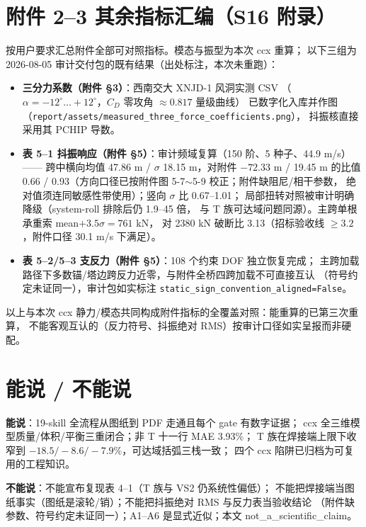 \documentclass[11pt,a4paper]{ctexart}
\begin{document}
\section{附件 2--3 其余指标汇编（S16 附录）}

按用户要求汇总附件全部可对照指标。模态与振型为本次 ccx 重算；
以下三组为 2026-08-05 审计交付包的既有结果（出处标注，本次未重跑）：

\begin{itemize}
  \item \textbf{三分力系数（附件 §3）}：西南交大 XNJD-1 风洞实测 CSV
        （$\alpha=-12^\circ\ldots+12^\circ$，$C_D$ 零攻角 $\approx0.817$ 量级曲线）
        已数字化入库并作图（\texttt{report/assets/measured\_three\_force\_coefficients.png}），
        抖振核直接采用其 PCHIP 导数。
  \item \textbf{表 5--1 抖振响应（附件 §5）}：审计频域复算（150 阶、5 种子、44.9 m/s）——
        跨中横向均值 47.86 m / $\sigma$ 18.15 m，对附件 $-72.33$ m / 19.45 m 的比值
        0.66 / 0.93（方向口径已按附件图 5-7$\sim$5-9 校正；附件缺阻尼/相干参数，
        绝对值须连同敏感性带使用）；竖向 $\sigma$ 比 0.67--1.01；
        局部扭转对照被审计明确降级（system-roll 排除后仍 1.9--45 倍，
        与 T 族可达域问题同源）。主跨单根承重索 mean$+3.5\sigma=761$ kN，
        对 2380 kN 破断比 3.13（招标验收线 $\ge3.2$，附件口径 30.1 m/s 下满足）。
  \item \textbf{表 5--2/5--3 支反力（附件 §5）}：108 个约束 DOF 独立恢复完成；
        主跨加载路径下多数锚/塔边跨反力近零，与附件全桥四跨加载不可直接互认
        （符号约定未证同一），审计包如实标注 \texttt{static\_sign\_convention\_aligned=False}。
\end{itemize}

以上与本次 ccx 静力/模态共同构成附件指标的全覆盖对照：能重算的已第三次重算，
不能客观互认的（反力符号、抖振绝对 RMS）按审计口径如实呈报而非硬配。

\section{能说 / 不能说}

\textbf{能说}：19-skill 全流程从图纸到 PDF 走通且每个 gate 有数字证据；
ccx 全三维模型质量/体积/平衡三重闭合；非 T 十一行 MAE 3.93\%；
T 族在焊接端上限下收窄到 $-18.5/-8.6/-7.9\%$，可达域括弧三栈一致；
四个 ccx 陷阱已归档为可复用的工程知识。

\textbf{不能说}：不能宣布复现表 4--1（T 族与 VS2 仍系统性偏低）；
不能把焊接端当图纸事实（图纸是滚轮/销）；不能把抖振绝对 RMS 与反力表当验收结论
（附件缺参数、符号约定未证同一）；A1--A6 是显式近似；本文 not\_a\_scientific\_claim。
\end{document}
